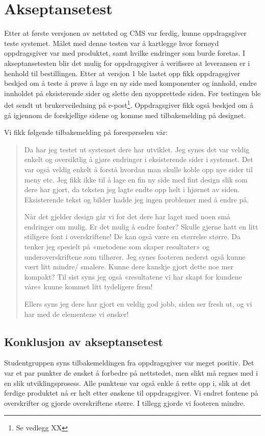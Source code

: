 \section{Akseptansetest}
Etter at første versjonen av nettsted og CMS var ferdig, kunne oppdragsgiver teste systemet. Målet med denne testen var å kartlegge hvor fornøyd oppdragsgiver var med produktet, samt hvilke endringer som burde foretas. I akseptansetesten blir det mulig for oppdragsgiver å verifisere at leveransen er i henhold til bestillingen. 
Etter at versjon 1 ble lastet opp fikk oppdragsgiver beskjed om å teste å prøve å lage en ny side med komponenter og innhold, endre innholdet på eksisterende sider og slette den nyopprettede siden. Før testingen ble det sendt ut brukerveiledning på e-post\footnote{Se vedlegg XX}. Oppdragsgiver fikk også beskjed om å gå igjennom de forskjellige sidene og komme med tilbakemelding på designet. 

Vi fikk følgende tilbakemelding på forespørselen vår: 

\begin{quote}
Da har jeg testet ut systemet dere har utviklet. Jeg synes det var veldig enkelt og oversiktlig å gjøre endringer i eksisterende sider i systemet. Det var også veldig enkelt å forstå hvordan man skulle koble opp nye sider til meny etc. Jeg fikk ikke til å lage en fin ny side med fint design slik som dere har gjort, da teksten jeg lagte endte opp helt i hjørnet av siden. Eksisterende tekst og bilder hadde jeg ingen problemer med å endre på.

Når det gjelder design går vi for det dere har laget med noen små endringer om mulig. Er det mulig å endre fonter? Skulle gjerne hatt en litt stiligere font i overskriftene! De kan også være en størrelse større. Da tenker jeg spesielt på «metodene som skaper resultater» og underoverskriftene som tilhører. Jeg synes footeren nederst også kunne vært litt mindre/ smalere. Kunne dere kanskje gjort dette noe mer kompakt? Til sist syns jeg også «resultatene vi har skapt for kundene våre» kunne kommet litt tydeligere frem!

Ellers syns jeg dere har gjort en veldig god jobb, siden ser fresh ut, og vi har med de elementene vi ønsker!
\end{quote}

\subsection{Konklusjon av akseptansetest}
Studentgruppen syns tilbakemeldingen fra oppdragsgiver var meget positiv. Det var et par punkter de ønsket å forbedre på nettstedet, men slikt må regnes med i en slik utviklingsprosess. Alle punktene var også enkle å rette opp i, slik at det ferdige produktet nå er helt etter ønskene til oppdragsgiver. Vi endret fontene på overskrifter og gjorde overskriftene større. I tillegg gjorde vi footeren mindre.

